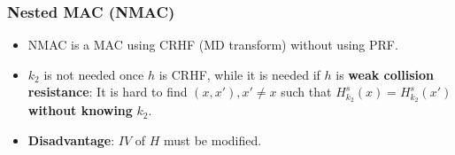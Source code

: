\begin{frame}\frametitle{Nested MAC (NMAC)}
\begin{figure}
\begin{center}

\end{center}
\end{figure}
\begin{itemize}
\item NMAC is a MAC using CRHF (MD transform) without using PRF.
\item $k_2$ is not needed once $h$ is CRHF, while it is needed if $h$ is \textbf{weak collision resistance}: It is hard to find $(x, x'), x' \ne x$ such that $H^s_{k_2}(x) = H^s_{k_2}(x')$ \textbf{without knowing} $k_2$.
\item \textbf{Disadvantage}: $IV$ of $H$ must be modified.
\end{itemize}
\end{frame}
